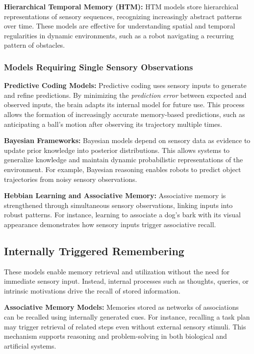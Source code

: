             \textbf{Hierarchical Temporal Memory (HTM):} HTM models store hierarchical representations of sensory sequences, recognizing increasingly abstract patterns over time. These models are effective for understanding spatial and temporal regularities in dynamic environments, such as a robot navigating a recurring pattern of obstacles. \cite{hawkins-2004-on-intelligence}

        \subsubsection{Models Requiring Single Sensory Observations}
            \textbf{Predictive Coding Models:} Predictive coding uses sensory inputs to generate and refine predictions. By minimizing the \textit{prediction error} between expected and observed inputs, the brain adapts its internal model for future use. This process allows the formation of increasingly accurate memory-based predictions, such as anticipating a ball’s motion after observing its trajectory multiple times. \cite{friston-2005-a-predictive-brain-how-perception-and-action-are-coupled-in-neural-networks}

            \textbf{Bayesian Frameworks:} Bayesian models depend on sensory data as evidence to update prior knowledge into posterior distributions. This allows systems to generalize knowledge and maintain dynamic probabilistic representations of the environment. For example, Bayesian reasoning enables robots to predict object trajectories from noisy sensory observations. \cite{friston-2010-the-free-energy-principle-a-unified-brain-theory}

            \textbf{Hebbian Learning and Associative Memory:} Associative memory is strengthened through simultaneous sensory observations, linking inputs into robust patterns. For instance, learning to associate a dog’s bark with its visual appearance demonstrates how sensory inputs trigger associative recall. \cite{hebb-1949-organization-of-behavior}

    \subsection{Internally Triggered Remembering}
    These models enable memory retrieval and utilization without the need for immediate sensory input. Instead, internal processes such as thoughts, queries, or intrinsic motivations drive the recall of stored information.

        \textbf{Associative Memory Models:} Memories stored as networks of associations can be recalled using internally generated cues. For instance, recalling a task plan may trigger retrieval of related steps even without external sensory stimuli. This mechanism supports reasoning and problem-solving in both biological and artificial systems. \cite{hebb-1949-organization-of-behavior}

